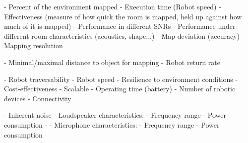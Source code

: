 - Percent of the environment mapped
- Execution time (Robot speed)
- Effectiveness (measure of how quick the room is mapped, held up against how much of it is mapped)
- Performance in different SNRs
- Performance under different room characteristics (acoustics, shape...)
- Map deviation (accuracy)
- Mapping resolution
    
- Minimal/maximal distance to object for mapping
- Robot return rate

- Robot traversability
- Robot speed
- Resilience to environment conditions
        - Cost-effectiveness
        - Scalable
- Operating time (battery)
- Number of robotic devices
- Connectivity


- Inherent noise
- Loudspeaker characteristics:
    - Frequency range
    - Power consumption
    - 
- Microphone characteristics:
    - Frequency range
    - Power consumption





